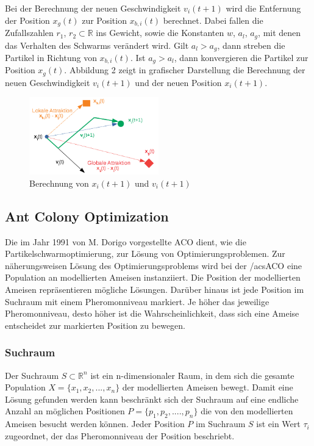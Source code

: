 \documentclass[a4paper, 11pt]{article}
\begin{document}
\par Bei der Berechnung der neuen Geschwindigkeit $v_{i}(t+1)$ wird die Entfernung der Position  $x_{g}(t)$ zur Position $x_{b,i}(t)$ berechnet. Dabei fallen die Zufallszahlen $r_{1}$, $r_{2} \subset \mathbb{R}$ ins Gewicht, sowie die Konstanten $w$, $a_{l}$, $a_{g}$, mit denen das Verhalten des Schwarms verändert wird. Gilt $a_{l} > a_{g}$, dann streben die Partikel in Richtung von $x_{b,i}(t)$. Ist $a_{g} > a_{l}$, dann konvergieren die Partikel zur Position $x_{g}(t)$. Abbildung 2 zeigt in grafischer Darstellung die Berechnung der neuen Geschwindigkeit $v_{i}(t+1)$ und der neuen Position $x_{i}(t+1)$.
\begin{figure}[h]
	\begin{center}
		\includegraphics[width=0.50\textwidth]{pso}
	\end{center}
	\hspace{1in}\parbox{4in}{\caption[\acs{PSO}, Berechnung von $x_{i}(t+1)$ und $v_{i}(t+1)$]{Berechnung von $x_{i}(t+1)$ und $v_{i}(t+1)$}}
	\label{psoabb}
\end{figure}
\newpage
\subsection{Ant Colony Optimization}
Die im Jahr 1991 von M. Dorigo vorgestellte \ac{ACO} dient, wie die Partikelschwarmoptimierung, zur Lösung von Optimierungsproblemen. Zur näherungsweisen Lösung des Optimierungsproblems wird bei der /acs{ACO} eine Population an modellierten Ameisen instanziiert. Die Position der modellierten Ameisen repräsentieren mögliche Lösungen. Darüber hinaus ist jede Position im Suchraum mit einem Pheromonniveau markiert. Je höher das jeweilige Pheromonniveau, desto höher ist die Wahrscheinlichkeit, dass sich eine Ameise entscheidet zur markierten Position zu bewegen.
\subsubsection{Suchraum}
Der Suchraum $S \subset \mathbb{R}^n$ ist ein n-dimensionaler Raum, in dem sich die gesamte Population $X=\{x_{1},x_{2},...,x_{n}\}$ der modellierten Ameisen bewegt. Damit eine Lösung gefunden werden kann beschränkt sich der Suchraum auf eine endliche Anzahl an möglichen Positionen $P=\{p_{1},p_{2},....,p_{n}\}$ die von den modellierten Ameisen besucht werden können. Jeder Position $P$ im Suchraum $S$ ist ein Wert $\tau_{i}$ zugeordnet, der das Pheromonniveau der Position beschriebt.
\end{document}
